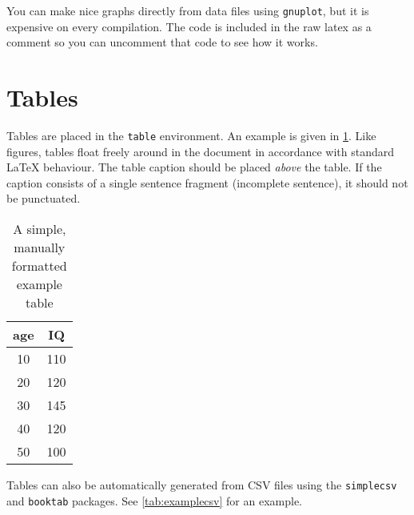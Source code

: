 You can make nice graphs directly from data files using \texttt{gnuplot}, but it is expensive on every compilation.  The code is included in the
raw latex as a comment so you can uncomment that code to see how it works.
%

\section{Tables}

Tables are placed in the \texttt{table} environment. An example is given in \cref{tab:example1}. Like figures, tables float freely around in the document in accordance with standard \LaTeX{} behaviour. The table caption should be placed \emph{above} the table. If the caption consists of a single sentence fragment (incomplete sentence), it should not be punctuated.

\begin{table}
  \centering
  \caption{A simple, manually formatted example table}
  \label{tab:example1}
  \begin{tabular}{cc}
    \hline
    age  & IQ \\
    \hline
    10   & 110 \\
    20   & 120 \\
    30   & 145 \\
    40   & 120 \\
    50   & 100 \\
    \hline
  \end{tabular}
\end{table}

Tables can also be automatically generated from CSV files using the \texttt{simplecsv} and \texttt{booktab} packages. See \cref{tab:examplecsv} for an example.

